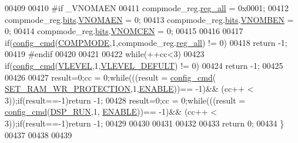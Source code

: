 \begin{DoxyCode}
00409                 
00410 \textcolor{preprocessor}{            #if \_VNOMAEN}
00411 \textcolor{preprocessor}{}            compmode\_reg.\hyperlink{a00021_a74e4d0cc3da3b66723322f38bfb7f371}{reg\_all} = 0x0001;   
00412             compmode\_reg.\hyperlink{a00021_adcc1b05e99ccb27a811df890d7f3f420}{bits}.\hyperlink{a00021_ad345cee8b6a6c1c0d928ba456681dbf2}{VNOMAEN}    = 0;
00413             compmode\_reg.\hyperlink{a00021_adcc1b05e99ccb27a811df890d7f3f420}{bits}.\hyperlink{a00021_aecd6c7afe1755d7eeb19009fd79ae48e}{VNOMBEN}    = 0;
00414             compmode\_reg.\hyperlink{a00021_adcc1b05e99ccb27a811df890d7f3f420}{bits}.\hyperlink{a00021_a20177bdcd0f50acba5d42927ac28e5f1}{VNOMCEN}    = 0;
00415          
00416            
00417             \textcolor{keywordflow}{if}(\hyperlink{a00005_ga369ee0e8379941cbc2c79b90ec3292da}{config\_cmd}(\hyperlink{a00036_a31c8d51fdc4d8181e8a66b9d4be2dd8c}{COMPMODE},1,compmode\_reg.\hyperlink{a00021_a74e4d0cc3da3b66723322f38bfb7f371}{reg\_all}) != 0)
00418             \textcolor{keywordflow}{return} -1;
00419 \textcolor{preprocessor}{            #endif}
00420 \textcolor{preprocessor}{}        
00421             
00422             \textcolor{keywordflow}{while}(++cc<3)
00423             \textcolor{keywordflow}{if}(\hyperlink{a00005_ga369ee0e8379941cbc2c79b90ec3292da}{config\_cmd}(\hyperlink{a00036_a601225f0680bfe13cf5fc0c2c52f37c5}{VLEVEL},1,\hyperlink{a00036_a489507ec5a9fe148bbc1b61afc07f27a}{VLEVEL\_DEFULT}) != 0)
00424             \textcolor{keywordflow}{return} -1;
00425       
00426             
00427              result=0;cc = 0;\textcolor{keywordflow}{while}(((result = \hyperlink{a00005_ga369ee0e8379941cbc2c79b90ec3292da}{config\_cmd}(
      \hyperlink{a00043_a5b534b9caab512045a6e762f3930a501}{SET\_RAM\_WR\_PROTECTION},1,\hyperlink{a00037_a514ad415fb6125ba296793df7d1a468a}{ENABLE}))== -1)&& (cc++ < 3));\textcolor{keywordflow}{if}(result==-1)\textcolor{keywordflow}{return} -1;
00428              result=0;cc = 0;\textcolor{keywordflow}{while}(((result = \hyperlink{a00005_ga369ee0e8379941cbc2c79b90ec3292da}{config\_cmd}(\hyperlink{a00043_a1805e103988f08b8fac817624918cf47}{DSP\_RUN},1,
      \hyperlink{a00037_a514ad415fb6125ba296793df7d1a468a}{ENABLE}))== -1)&& (cc++ < 3));\textcolor{keywordflow}{if}(result==-1)\textcolor{keywordflow}{return} -1;
00429             
00430             
00431                    
00432                 
00433         \textcolor{keywordflow}{return} 0;   
00434  \}
00437 
00438 
00439 
\end{DoxyCode}
